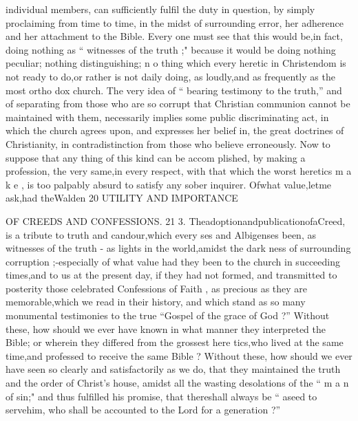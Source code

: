 \documentclass[
]{book}
\begin{document}
individual members, can sufficiently fulfil the
duty in question, by simply proclaiming from time to time, in the midst of surrounding error, her adherence and her attachment to
the Bible. Every one must see that this would be,in fact, doing nothing as `` witnesses of the truth ;" because it would be doing nothing peculiar; nothing distinguishing; n o thing which every heretic in Christendom is not ready to do,or rather is not daily doing, as loudly,and as frequently as the most ortho dox church. The very idea of `` bearing
testimony to the truth,'' and of separating
from those who are so corrupt that Christian communion cannot be maintained with them,
necessarily implies some public discriminating act, in which the church agrees upon, and
expresses her belief in, the great doctrines of
Christianity, in contradistinction from those who believe erroneously. Now to suppose
that any thing of this kind can be accom plished, by making a profession, the very same,in every respect, with that which the
worst heretics m a k e , is too palpably absurd to satisfy any sober inquirer.
Ofwhat value,letme ask,had theWalden
20 UTILITY AND IMPORTANCE

OF CREEDS AND CONFESSIONS. 21
3. TheadoptionandpublicationofaCreed, is a tribute to truth and candour,which every
ses and Albigenses been, as witnesses of the
truth - as lights in the world,amidst the dark
ness of surrounding corruption ;-especially of
what value had they been to the church in
succeeding times,and to us at the present day, if they had not formed, and transmitted to
posterity those celebrated Confessions of Faith , as precious as they are memorable,which we
read in their history, and which stand as so many monumental testimonies to the true
``Gospel of the grace of God ?'' Without these, how should we ever have known in
what manner they interpreted the Bible; or
wherein they differed from the grossest here
tics,who lived at the same time,and professed
to receive the same Bible ? Without these,
how should we ever have seen so clearly and
satisfactorily as we do, that they maintained the truth and the order of Christ's house,
amidst all the wasting desolations of the `` m a n of sin;" and thus fulfilled his promise, that
thereshall always be `` aseed to servehim, who shall be accounted to the Lord for a
generation ?''
\end{document}

